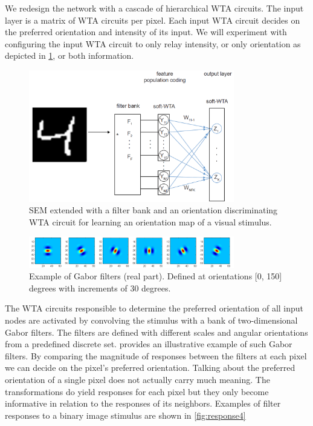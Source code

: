 \documentclass{report}
\begin{document}
We redesign the network with a cascade of hierarchical WTA circuits. The input layer is a matrix of WTA circuits per pixel. Each input WTA circuit decides on the preferred orientation and intensity of its input. We will experiment with configuring the input WTA circuit to only relay intensity, or only orientation as depicted in \cref{fig:network_learn_orientations}, or both information.

\begin{figure}[ht]
\centering
\includegraphics[width=0.8\textwidth]{network_learn_orientations}
\caption{SEM extended with a filter bank and an orientation discriminating WTA circuit for learning an orientation map of a visual stimulus. \label{fig:network_learn_orientations}}
\end{figure}

\begin{figure}[ht]
\centering
\includegraphics[width=0.8\textwidth]{filters_real}
\caption{Example of Gabor filters (real part). Defined at orientations [0, 150] degrees with increments of 30 degrees. \label{fig:filters_real}}
\end{figure}

The WTA circuits responsible to determine the preferred orientation of all input nodes are activated by convolving the stimulus with a bank of two-dimensional Gabor filters. The filters are defined with different scales and angular orientations from a predefined discrete set.  provides an illustrative example of such Gabor filters. By comparing the magnitude of responses between the filters at each pixel we can decide on the pixel's preferred orientation. Talking about the preferred orientation of a single pixel does not actually carry much meaning. The transformations do yield responses for each pixel but they only become informative in relation to the responses of its neighbors. Examples of filter responses to a binary image stimulus are shown in \cref{fig:response4}
\end{document}
